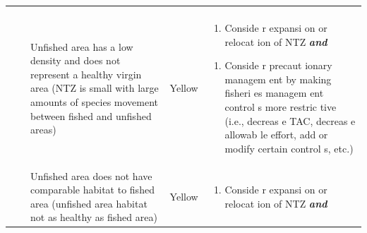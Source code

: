\documentclass[]{book}
\providecommand{\tightlist}{%
  \setlength{\itemsep}{0pt}\setlength{\parskip}{0pt}}
\begin{document}
\begin{longtable}[]{@{}lllll@{}}
\begin{minipage}[t]{0.19\columnwidth}
\end{minipage}\tabularnewline
\begin{minipage}[t]{0.19\columnwidth}\raggedright\strut
\strut
\end{minipage} & \begin{minipage}[t]{0.19\columnwidth}\raggedright\strut
\strut
\end{minipage} & \begin{minipage}[t]{0.19\columnwidth}\raggedright\strut
Unfished area has a low density and does not represent a healthy virgin
area (NTZ is small with large amounts of species movement between fished
and unfished areas)\strut
\end{minipage} & \begin{minipage}[t]{0.19\columnwidth}\raggedright\strut
Yellow\strut
\end{minipage} & \begin{minipage}[t]{0.19\columnwidth}\raggedright\strut
\begin{enumerate}
\def\labelenumi{\arabic{enumi}.}
\tightlist
\item
  Conside r expansi on or relocat ion of NTZ \textbf{\emph{and} }
\end{enumerate}

\begin{enumerate}
\def\labelenumi{\arabic{enumi}.}
\tightlist
\item
  Conside r precaut ionary managem ent by making fisheri es managem ent
  control s more restric tive (i.e., decreas e TAC, decreas e allowab le
  effort, add or modify certain control s, etc.)
\end{enumerate}\strut
\end{minipage}\tabularnewline
\begin{minipage}[t]{0.19\columnwidth}\raggedright\strut
\strut
\end{minipage} & \begin{minipage}[t]{0.19\columnwidth}\raggedright\strut
\strut
\end{minipage} & \begin{minipage}[t]{0.19\columnwidth}\raggedright\strut
Unfished area does not have comparable habitat to fished area (unfished
area habitat not as healthy as fished area)\strut
\end{minipage} & \begin{minipage}[t]{0.19\columnwidth}\raggedright\strut
Yellow\strut
\end{minipage} & \begin{minipage}[t]{0.19\columnwidth}\raggedright\strut
\begin{enumerate}
\def\labelenumi{\arabic{enumi}.}
\tightlist
\item
  Conside r expansi on or relocat ion of NTZ \textbf{\emph{and} }
\end{enumerate}


\end{minipage}
\end{longtable}
\end{document}
